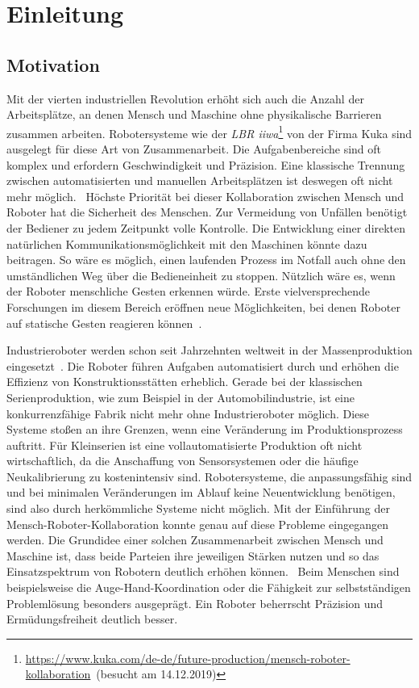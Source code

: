 \chapter{Einleitung}

\section{Motivation}
Mit der vierten industriellen Revolution erhöht sich auch die Anzahl der Arbeitsplätze, an denen Mensch und Maschine ohne physikalische Barrieren zusammen arbeiten. Robotersysteme wie der \textit{LBR iiwa}\footnote{\url{https://www.kuka.com/de-de/future-production/mensch-roboter-kollaboration}~(besucht am 14.12.2019)} von der Firma Kuka sind ausgelegt für diese Art von Zusammenarbeit. Die Aufgabenbereiche sind oft komplex und erfordern Geschwindigkeit und Präzision. Eine klassische Trennung zwischen automatisierten und manuellen Arbeitsplätzen ist deswegen oft nicht mehr möglich.~\cite{ObererTreitz.2019} Höchste Priorität bei dieser Kollaboration zwischen Mensch und Roboter hat die Sicherheit des Menschen. Zur Vermeidung von Unfällen benötigt der Bediener zu jedem Zeitpunkt volle Kontrolle. Die Entwicklung einer direkten natürlichen Kommunikationsmöglichkeit mit den Maschinen könnte dazu beitragen. So wäre es möglich, einen laufenden Prozess im Notfall auch ohne den umständlichen Weg über die Bedieneinheit zu stoppen. Nützlich wäre es, wenn der Roboter menschliche Gesten erkennen würde. Erste vielversprechende Forschungen im diesem Bereich eröffnen neue Möglichkeiten, bei denen Roboter auf statische Gesten reagieren können~\cite{flexibleSystem}.

Industrieroboter werden schon seit Jahrzehnten weltweit in der Massenproduktion eingesetzt~\cite{ObererTreitz.2019}. Die Roboter führen Aufgaben automatisiert durch und erhöhen die Effizienz von Konstruktionsstätten erheblich. Gerade bei der klassischen Serienproduktion, wie zum Beispiel in der Automobilindustrie, ist eine konkurrenzfähige Fabrik nicht mehr ohne Industrieroboter möglich. Diese Systeme stoßen an ihre Grenzen, wenn eine Veränderung im Produktionsprozess auftritt. Für Kleinserien ist eine vollautomatisierte Produktion oft nicht wirtschaftlich, da die Anschaffung von Sensorsystemen oder die häufige Neukalibrierung zu kostenintensiv sind. Robotersysteme, die anpassungsfähig sind und bei minimalen Veränderungen im Ablauf keine Neuentwicklung benötigen, sind also durch herkömmliche Systeme nicht möglich. Mit der Einführung der Mensch-Roboter-Kollaboration konnte genau auf diese Probleme eingegangen werden. Die Grundidee einer solchen Zusammenarbeit zwischen Mensch und Maschine ist, dass beide Parteien ihre jeweiligen Stärken nutzen und so das Einsatzspektrum von Robotern deutlich erhöhen können.~\cite{ObererTreitz.2019} Beim Menschen sind beispielsweise die Auge-Hand-Koordination oder die Fähigkeit zur selbstständigen Problemlösung besonders ausgeprägt. Ein Roboter beherrscht Präzision und Ermüdungsfreiheit deutlich besser.~\cite{fraunhoferMRK}

